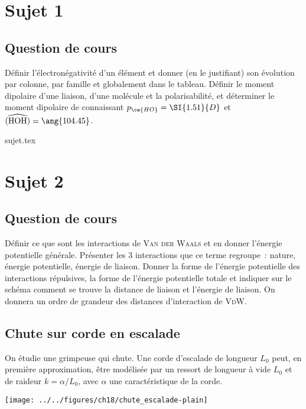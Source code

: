 \documentclass[a4paper, 11pt]{book}
\renewcommand{\a}[0]{\alpha}
\begin{document}
\chapter{Sujet 1}
\section{Question de cours}

Définir l'électronégativité d'un élément et donner (en le justifiant) son
évolution par colonne, par famille et globalement dans le tableau. Définir le
moment dipolaire d'une liaison, d'une molécule et la polarisabilité, et
déterminer le moment dipolaire de  connaissant $p_{\ce{HO}} =
\SI{1.51}{D}$ et $\widehat{({\rm HOH})} = \ang{104.45}$.

\resetQ
{sujet.tex}

\chapter{Sujet 2}
\section{Question de cours}

Définir ce que sont les interactions de \textsc{Van der Waals} et en donner
l'énergie potentielle générale. Présenter les 3 interactions que ce terme
regroupe~: nature, énergie potentielle, énergie de liaison. Donner la forme de
l'énergie potentielle des interactions répulsives, la forme de l'énergie
potentielle totale et indiquer sur le schéma comment se trouve la distance de
liaison et l'énergie de liaison. On donnera un ordre de grandeur des distances
d'interaction de \textsc{VdW}.

\resetQ
\section{Chute sur corde en escalade}
On étudie une grimpeuse qui chute. Une corde d'escalade de longueur $L_0$ peut,
en première approximation, être modélisée par un ressort de longueur à vide
$L_0$ et de raideur $k = \a/L_0$, avec $\a$ une caractéristique de la corde.

\begin{center}
    \texttt{[image: ../../figures/ch18/chute\_escalade-plain]}
\end{center}
\end{document}
